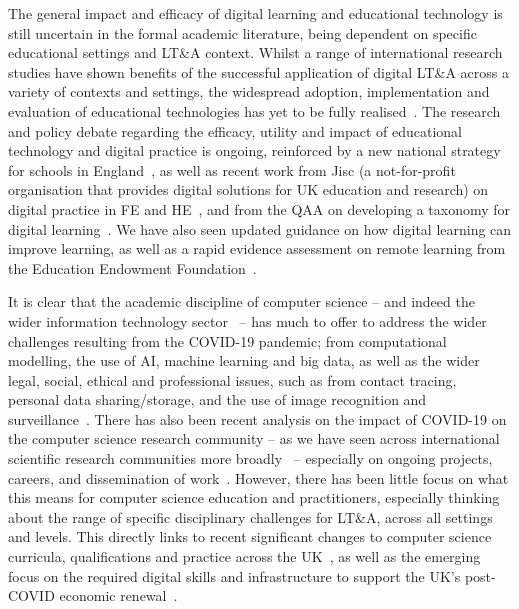 \documentclass[sigconf]{acmart}
\begin{document}
The general impact and efficacy of digital learning and educational
technology is still uncertain in the formal academic literature, being
dependent on specific educational settings and LT\&A context. Whilst a
range of international research studies have shown benefits of the
successful application of digital LT\&A across a variety of contexts
and settings, the widespread adoption, implementation and evaluation
of educational technologies has yet to be fully
realised~\cite{decodinglearning:2012,means:2014,ecjrc:2017,mayer:2018}.
The research and policy debate regarding the efficacy, utility and
impact of educational technology and digital practice is ongoing,
reinforced by a new national strategy for schools in
England~\cite{dfe:2019}, as well as recent work from Jisc (a
not-for-profit organisation that provides digital solutions for UK
education and research) on digital practice in FE and
HE~\cite{lanclos+phipps:2019}, and from the QAA on developing a
taxonomy for digital learning~\cite{qaadigtaxonomy:2020}. We have also
seen updated guidance on how digital learning can improve learning, as
well as a rapid evidence assessment on remote learning from the
Education Endowment
Foundation~\cite{eefdigtech:2019,eefremote:2020}.

It is clear that the academic discipline of computer science -- and
indeed the wider information technology sector~\cite{bcs:2020} -- has
much to offer to address the wider challenges resulting from the
COVID-19 pandemic; from computational modelling, the use of AI,
machine learning and big data, as well as the wider legal, social,
ethical and professional issues, such as from contact tracing,
personal data sharing/storage, and the use of image recognition and
surveillance~\cite{ting-et-al:2020,cerf:2020,chun-et-al:2020,bbcnews:2020}. There
has also been recent analysis on the impact of COVID-19 on the
computer science research community -- as we have seen across
international scientific research communities more
broadly~\cite{oecdcovid19:2020} -- especially on ongoing projects,
careers, and dissemination of work~\cite{msrcovid19:2020}. However,
there has been little focus on what this means for computer science
education and practitioners, especially thinking about the range of
specific disciplinary challenges for LT\&A, across all settings and
levels. This directly links to recent significant changes to computer
science curricula, qualifications and practice across the
UK~\cite{brown-et-al-toce2014,davenport-et-al:latice2016,
murphy-et-al:programming2017, prickett-et-al:iticse2020}, as well as
the emerging focus on the required digital skills and infrastructure
to support the UK's post-COVID economic
renewal~\cite{tryfonas+crick:petra2018,crick-et-al:fie2019,davenport-et-al:educon2020}.
\end{document}
